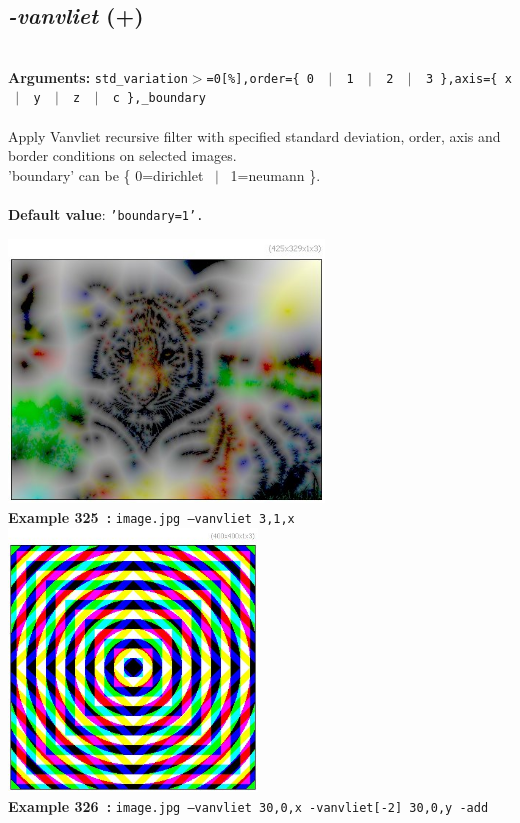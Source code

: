 \documentclass[a4paper,11pt,twoside]{book}
\begin{document}
\subsection{\emph{-vanvliet} (+)}\vspace*{-0.5em}
~\\\textbf{Arguments: } 
{\small \texttt{std\_variation$>$=0[\%],order=\{ 0 ~$|$~ 1 ~$|$~ 2 ~$|$~ 3 \},axis=\{ x ~$|$~ y ~$|$~ z ~$|$~ c \},\_boundary}}\\~\\
Apply Vanvliet recursive filter with specified standard deviation, order, axis and border
conditions on selected images.
~\\'boundary' can be \{ 0=dirichlet ~$|$~ 1=neumann \}.
~\\~\\\textbf{Default value}: {\small \texttt{'boundary=1'.}}
\begin{center}\includegraphics[keepaspectratio=true,height=7cm,width=\textwidth]{img/gmic_def325.jpg}\\
{\footnotesize \textbf{Example 325~:} \texttt{image.jpg --vanvliet 3,1,x}}
\\\includegraphics[keepaspectratio=true,height=7cm,width=\textwidth]{img/gmic_def326.jpg}\\
{\footnotesize \textbf{Example 326~:} \texttt{image.jpg --vanvliet 30,0,x -vanvliet[-2] 30,0,y -add}}
\end{center}
\end{document}
